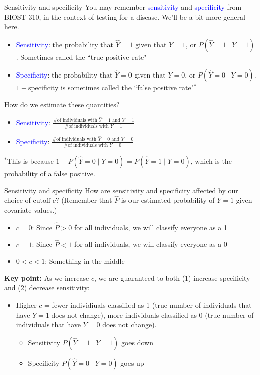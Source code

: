\documentclass[10pt,t]{beamer}
\begin{document}
\begin{frame}{Sensitivity and specificity}
	You may remember \textcolor{blue}{sensitivity} and \textcolor{blue}{specificity} from BIOST 310, in the context of testing for a disease. We'll be a bit more general here. \pause
	\begin{itemize}
		\item \textcolor{blue}{Sensitivity}: the probability that $\hat{Y} = 1$ given that $Y = 1$, or $P(\hat{Y}= 1 \mid Y = 1)$. Sometimes called the ``true positive rate"\pause
		\item \textcolor{blue}{Specificity}: the probability that $\hat{Y}= 0$ given that $Y = 0$, or $P(\hat{Y} = 0 \mid Y = 0)$. $1 - $specificity is sometimes called the ``false positive rate"$^*$\pause
	\end{itemize}
	How do we estimate these quantities?\pause
	\begin{itemize}
		\item \textcolor{blue}{Sensitivity}: $\frac{\text{\# of individuals with }\hat{Y}= 1 \text{ and } Y = 1}{\text{\# of individuals with }Y = 1}$\pause
		\item \textcolor{blue}{Specificity}: $\frac{\text{\# of individuals with }\hat{Y}= 0 \text{ and } Y = 0}{\text{\# of individuals with }Y = 0}$\pause
	\end{itemize}
\vfill
	\footnotesize $^*$This is because $1 - P(\hat{Y}= 0 \mid Y = 0) = P(\hat{Y}= 1 \mid Y = 0)$, which is the probability of a false positive. 
\end{frame}

\begin{frame}{Sensitivity and specificity}
	How are sensitivity and specificity affected by our choice of cutoff $c$? \pause (Remember that $\hat{P}$ is our estimated probability of $Y = 1$ given covariate values.)
	\begin{itemize}
		\item $c = 0$: Since $\hat{P} > 0$ for all individuals, we will classify everyone as a 1\pause
		\item $c = 1$: Since $\hat{P} < 1$ for all individuals, we will classify everyone as a 0\pause
		\item $0 < c < 1$: Something in the middle \pause
	\end{itemize}
	\textbf{Key point:} As we increase $c$, we are guaranteed to both (1) increase specificity and (2) decrease sensitivity: \pause
	\begin{itemize}
		\item Higher $c$  = fewer individiuals classified as 1 (true number of individuals that have $Y = 1$ does not change), more individuals classified as 0 (true number of individuals that have $Y = 0$ does not change). \pause
		\begin{itemize}
			\item Sensitivity $P(\hat{Y}= 1 \mid Y = 1)$ goes down \pause
			\item Specificity $P(\hat{Y}= 0 \mid Y = 0)$ goes up
		\end{itemize}
	\end{itemize}
\end{frame}
\end{document}
